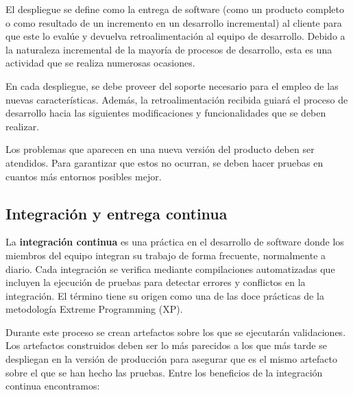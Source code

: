 \documentclass[11pt,spanish,listoffigures]{tfgetsinf}
\begin{document}
El despliegue se define como la entrega de software (como un producto completo o como resultado de un incremento en un desarrollo incremental) al cliente para que este lo evalúe y devuelva retroalimentación al equipo de desarrollo. \cite{Pressman} Debido a la naturaleza incremental de la mayoría de procesos de desarrollo, esta es una actividad que se realiza numerosas ocasiones. 

En cada despliegue, se debe proveer del soporte necesario para el empleo de las nuevas características. Además, la retroalimentación recibida guiará el proceso de desarrollo hacia las siguientes modificaciones y funcionalidades que se deben realizar.

Los problemas que aparecen en una nueva versión del producto deben ser atendidos. Para garantizar que estos no ocurran, se deben hacer pruebas en cuantos más entornos posibles mejor.

\subsection{Integración y entrega continua}

La \textbf{integración continua} es una práctica en el desarrollo de software donde los miembros del equipo integran su trabajo de forma frecuente, normalmente a diario. Cada integración se verifica mediante compilaciones automatizadas que incluyen la ejecución de pruebas para detectar errores y conflictos en la integración. \cite{Fowler2006} El término tiene su origen como una de las doce prácticas de la metodología Extreme Programming (XP).

Durante este proceso se crean artefactos sobre los que se ejecutarán validaciones. Los artefactos construidos deben ser lo más parecidos a los que más tarde se despliegan en la versión de producción para asegurar que es el mismo artefacto sobre el que se han hecho las pruebas. Entre los beneficios de la integración continua encontramos:
 
\end{document}
